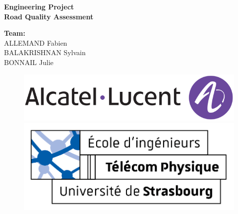 \documentclass{article}
\begin{document}
\thispagestyle{empty}
\addtocounter{page}{-1}
\begin{center}
    \baselineskip=50pt
    \vspace*{1cm}
    \textbf{{\Huge Engineering Project}}\\
    \vspace*{0.25cm}
    \textbf{{\Huge Road Quality Assessment}}\\
    \vspace*{0.25cm}
    \begin{minipage}[c]{.46\linewidth}
        \centering
        \textbf{Team:}\\
        ALLEMAND Fabien\\BALAKRISHNAN Sylvain\\BONNAIL Julie
    \end{minipage}
\end{center}
\vspace*{0.1cm}

\begin{figure}[H]
    \centering
    \centerline{\includegraphics[scale=.66]{../../common/logo_Alcatel_1.png}}
    \vspace*{0.1cm}
    \centerline{\includegraphics[scale=1.25]{../../common/logo_TPS_2.png}}
\end{figure}

\newpage
\vspace*{0.01cm}
\tableofcontents

\newpage
\vspace*{0.01cm}
\listoffigures

\newpage
\vspace*{0.01cm}

















\newpage
\vspace*{0.01cm}


\end{document}
